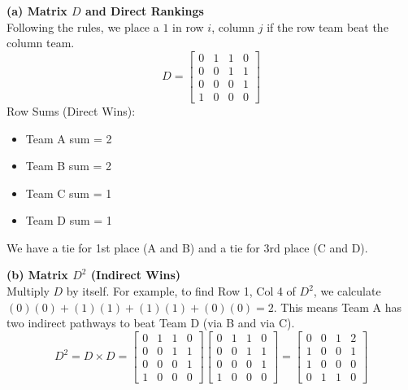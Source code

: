 \begin{solution}
\textbf{(a) Matrix $D$ and Direct Rankings} \\
Following the rules, we place a $1$ in row $i$, column $j$ if the row team beat the column team.
\[
D = \begin{bmatrix} 
0 & 1 & 1 & 0 \\ 
0 & 0 & 1 & 1 \\ 
0 & 0 & 0 & 1 \\ 
1 & 0 & 0 & 0 
\end{bmatrix}
\]
Row Sums (Direct Wins):
\begin{itemize}
  \item Team A sum = 2
  \item Team B sum = 2
  \item Team C sum = 1
  \item Team D sum = 1
\end{itemize}
We have a tie for 1st place (A and B) and a tie for 3rd place (C and D).

\medskip
\textbf{(b) Matrix $D^2$ (Indirect Wins)} \\
Multiply $D$ by itself. For example, to find Row 1, Col 4 of $D^2$, we calculate $(0)(0) + (1)(1) + (1)(1) + (0)(0) = 2$. This means Team A has two indirect pathways to beat Team D (via B and via C).
\[
D^2 = D \times D = 
\begin{bmatrix} 0 & 1 & 1 & 0 \\ 0 & 0 & 1 & 1 \\ 0 & 0 & 0 & 1 \\ 1 & 0 & 0 & 0 \end{bmatrix}
\begin{bmatrix} 0 & 1 & 1 & 0 \\ 0 & 0 & 1 & 1 \\ 0 & 0 & 0 & 1 \\ 1 & 0 & 0 & 0 \end{bmatrix}
=
\begin{bmatrix} 
0 & 0 & 1 & 2 \\ 
1 & 0 & 0 & 1 \\ 
1 & 0 & 0 & 0 \\ 
0 & 1 & 1 & 0 
\end{bmatrix}
\]


\end{solution}
